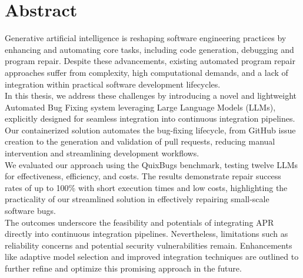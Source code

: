 \thispagestyle{empty}

\section*{Abstract}
Generative artificial intelligence is reshaping software engineering practices by enhancing and automating core tasks, including code generation, debugging and program repair. Despite these advancements, existing automated program repair approaches suffer from complexity, high computational demands, and a lack of integration within practical software development lifecycles.
\\
In this thesis, we address these challenges by introducing a novel and lightweight Automated Bug Fixing system leveraging Large Language Models (LLMs), explicitly designed for seamless integration into continuous integration pipelines. Our containerized solution automates the bug-fixing lifecycle, from GitHub issue creation to the generation and validation of pull requests, reducing manual intervention and streamlining development workflows.\\
We evaluated our approach using the QuixBugs benchmark, testing twelve LLMs for effectiveness, efficiency, and costs. The results demonstrate repair success rates of up to 100\% with short execution times and low costs, highlighting the practicality of our streamlined solution in effectively repairing small-scale software bugs. 
\\
The outcomes underscore the feasibility and potentials of integrating APR directly into continuous integration pipelines. Nevertheless, limitations such as reliability concerns and potential security vulnerabilities remain. Enhancements like adaptive model selection and improved integration techniques are outlined to further refine and optimize this promising approach in the future. 
